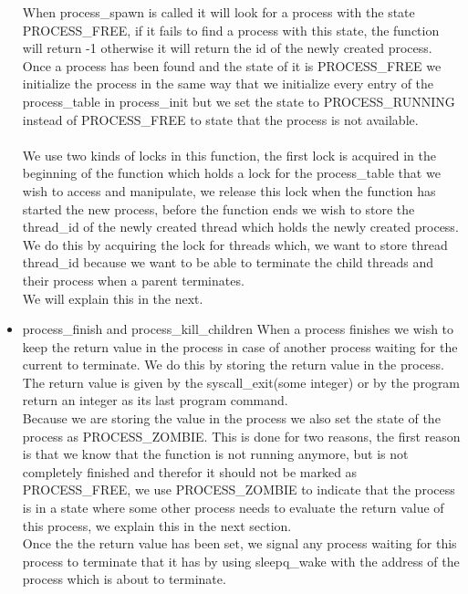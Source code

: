 \documentclass[a4paper,12pt,danish]{report}
\begin{document}
\begin{itemize}
  When process\_spawn is called it will look for a process with the state PROCESS\_FREE, if it fails to find a process with this state, the function will return -1 otherwise it will return the id of the newly created process.
  \\
  Once a process has been found and the state of it is PROCESS\_FREE we initialize the process in the same way that we initialize every entry of the process\_table in process\_init but we set the state to PROCESS\_RUNNING instead of PROCESS\_FREE to state that the process is not available.
  \\
  \\
  We use two kinds of locks in this function, the first lock is acquired in the beginning of the function which holds a lock for the process\_table that we wish to access and manipulate, we release this lock when the function has started the new process, before the function ends we wish to store the thread\_id of the newly created thread which holds the newly created process.
  \\
  We do this by acquiring the lock for threads which, we want to store thread thread\_id because we want to be able to terminate the child threads and their process when a parent terminates.
  \\
  We will explain this in the next.
  \item{process\_finish and process\_kill\_children}
  When a process finishes we wish to keep the return value in the process in case of another process waiting for the current to terminate. We do this by storing the return value in the process.
  \\
  The return value is given by the syscall\_exit(some integer) or by the program return an integer as its last program command.
  \\
  Because we are storing the value in the process we also set the state of the process as PROCESS\_ZOMBIE. This is done for two reasons, the first reason is that we know that the function is not running anymore, but is not completely finished and therefor it should not be marked as PROCESS\_FREE, we use PROCESS\_ZOMBIE to indicate that the process is in a state where some other process needs to evaluate the return value of this process, we explain this in the next section.
  \\
  Once the the return value has been set, we signal any process waiting for this process to terminate that it has by using sleepq\_wake with the address of the process which is about to terminate.
  \\

\end{itemize}
\end{document}
